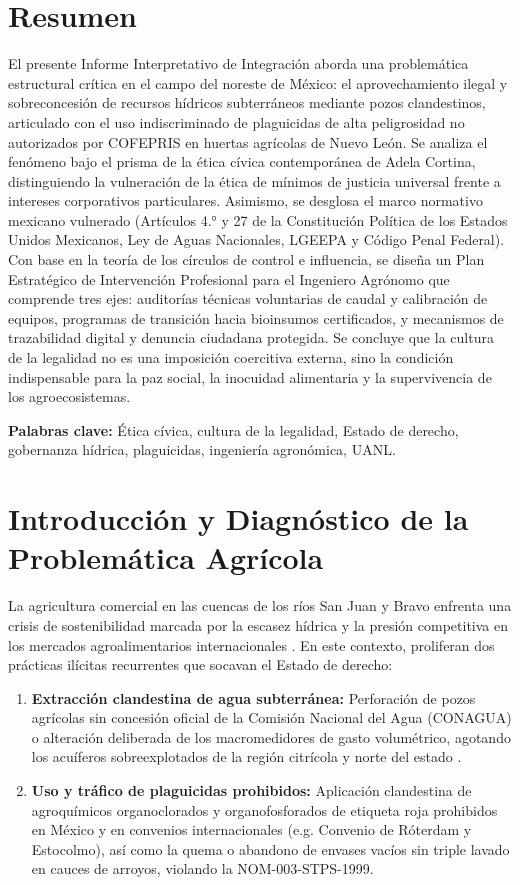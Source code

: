 \section*{Resumen}
El presente Informe Interpretativo de Integración aborda una problemática estructural crítica en el campo del noreste de México: el aprovechamiento ilegal y sobreconcesión de recursos hídricos subterráneos mediante pozos clandestinos, articulado con el uso indiscriminado de plaguicidas de alta peligrosidad no autorizados por COFEPRIS en huertas agrícolas de Nuevo León. Se analiza el fenómeno bajo el prisma de la ética cívica contemporánea de Adela Cortina, distinguiendo la vulneración de la ética de mínimos de justicia universal frente a intereses corporativos particulares. Asimismo, se desglosa el marco normativo mexicano vulnerado (Artículos 4.° y 27 de la Constitución Política de los Estados Unidos Mexicanos, Ley de Aguas Nacionales, LGEEPA y Código Penal Federal). Con base en la teoría de los círculos de control e influencia, se diseña un Plan Estratégico de Intervención Profesional para el Ingeniero Agrónomo que comprende tres ejes: auditorías técnicas voluntarias de caudal y calibración de equipos, programas de transición hacia bioinsumos certificados, y mecanismos de trazabilidad digital y denuncia ciudadana protegida. Se concluye que la cultura de la legalidad no es una imposición coercitiva externa, sino la condición indispensable para la paz social, la inocuidad alimentaria y la supervivencia de los agroecosistemas.

\vspace{0.4cm}
\noindent\textbf{Palabras clave:} Ética cívica, cultura de la legalidad, Estado de derecho, gobernanza hídrica, plaguicidas, ingeniería agronómica, UANL.

\section{Introducción y Diagnóstico de la Problemática Agrícola}
La agricultura comercial en las cuencas de los ríos San Juan y Bravo enfrenta una crisis de sostenibilidad marcada por la escasez hídrica y la presión competitiva en los mercados agroalimentarios internacionales \parencite{cortina2013, cndh2020}. En este contexto, proliferan dos prácticas ilícitas recurrentes que socavan el Estado de derecho:
\begin{enumerate}
    \item \textbf{Extracción clandestina de agua subterránea:} Perforación de pozos agrícolas sin concesión oficial de la Comisión Nacional del Agua (CONAGUA) o alteración deliberada de los macromedidores de gasto volumétrico, agotando los acuíferos sobreexplotados de la región citrícola y norte del estado \parencite{cpeum2024}.
    \item \textbf{Uso y tráfico de plaguicidas prohibidos:} Aplicación clandestina de agroquímicos organoclorados y organofosforados de etiqueta roja prohibidos en México y en convenios internacionales (e.g. Convenio de Róterdam y Estocolmo), así como la quema o abandono de envases vacíos sin triple lavado en cauces de arroyos, violando la NOM-003-STPS-1999.
\end{enumerate}

